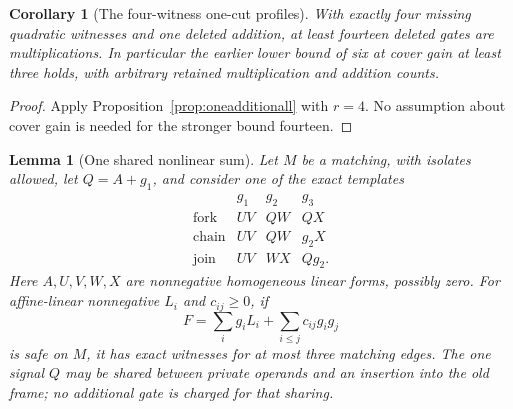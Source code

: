 \documentclass[11pt]{article}
\newtheorem{lemma}[theorem]{Lemma}
\newtheorem{corollary}[theorem]{Corollary}
\theoremstyle{definition}
\theoremstyle{remark}
\begin{document}
\begin{corollary}[The four-witness one-cut profiles]\label{prop:onecutgainthree}
With exactly four missing quadratic witnesses and one deleted addition, at least fourteen deleted gates are multiplications. In particular the earlier lower bound of six at cover gain at least three holds, with arbitrary retained multiplication and addition counts.
\end{corollary}
\begin{proof}
Apply Proposition~\ref{prop:oneadditionall} with $r=4$. No assumption about cover gain is needed for the stronger bound fourteen.
\end{proof}

\begin{lemma}[One shared nonlinear sum]\label{lem:sharednonlinearsum}
Let $M$ be a matching, with isolates allowed, let $Q=A+g_1$, and consider one of the exact templates
\[
\begin{array}{c|ccc}
 &g_1&g_2&g_3\\ \hline
 \text{fork}&UV&QW&QX\\
 \text{chain}&UV&QW&g_2X\\
 \text{join}&UV&WX&Qg_2.
\end{array}
\]
Here $A,U,V,W,X$ are nonnegative homogeneous linear forms, possibly zero. For affine-linear nonnegative $L_i$ and $c_{ij}\ge0$, if
\[
 F=\sum_i g_iL_i+\sum_{i\le j}c_{ij}g_ig_j
\]
is safe on $M$, it has exact witnesses for at most three matching edges. The one signal $Q$ may be shared between private operands and an insertion into the old frame; no additional gate is charged for that sharing.
\end{lemma}
\end{document}
